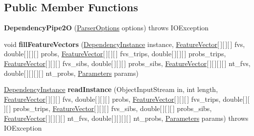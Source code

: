 \subsection*{Public Member Functions}
\begin{DoxyCompactItemize}
\item 
\hypertarget{classmstparser_1_1DependencyPipe2O_a552af844f0b5a779dae5b9fd55521396}{
{\bfseries DependencyPipe2O} (\hyperlink{classmstparser_1_1ParserOptions}{ParserOptions} options)  throws IOException }
\label{classmstparser_1_1DependencyPipe2O_a552af844f0b5a779dae5b9fd55521396}

\item 
\hypertarget{classmstparser_1_1DependencyPipe2O_a8c6d0b632717356802aa04e0ea8f2e9c}{
void {\bfseries fillFeatureVectors} (\hyperlink{classmstparser_1_1DependencyInstance}{DependencyInstance} instance, \hyperlink{classmstparser_1_1FeatureVector}{FeatureVector}\mbox{[}$\,$\mbox{]}\mbox{[}$\,$\mbox{]}\mbox{[}$\,$\mbox{]} fvs, double\mbox{[}$\,$\mbox{]}\mbox{[}$\,$\mbox{]}\mbox{[}$\,$\mbox{]} probs, \hyperlink{classmstparser_1_1FeatureVector}{FeatureVector}\mbox{[}$\,$\mbox{]}\mbox{[}$\,$\mbox{]}\mbox{[}$\,$\mbox{]} fvs\_\-trips, double\mbox{[}$\,$\mbox{]}\mbox{[}$\,$\mbox{]}\mbox{[}$\,$\mbox{]} probs\_\-trips, \hyperlink{classmstparser_1_1FeatureVector}{FeatureVector}\mbox{[}$\,$\mbox{]}\mbox{[}$\,$\mbox{]}\mbox{[}$\,$\mbox{]} fvs\_\-sibs, double\mbox{[}$\,$\mbox{]}\mbox{[}$\,$\mbox{]}\mbox{[}$\,$\mbox{]} probs\_\-sibs, \hyperlink{classmstparser_1_1FeatureVector}{FeatureVector}\mbox{[}$\,$\mbox{]}\mbox{[}$\,$\mbox{]}\mbox{[}$\,$\mbox{]}\mbox{[}$\,$\mbox{]} nt\_\-fvs, double\mbox{[}$\,$\mbox{]}\mbox{[}$\,$\mbox{]}\mbox{[}$\,$\mbox{]}\mbox{[}$\,$\mbox{]} nt\_\-probs, \hyperlink{classmstparser_1_1Parameters}{Parameters} params)}
\label{classmstparser_1_1DependencyPipe2O_a8c6d0b632717356802aa04e0ea8f2e9c}

\item 
\hypertarget{classmstparser_1_1DependencyPipe2O_acf28a11a4f3342130b68b75cf6198f6c}{
\hyperlink{classmstparser_1_1DependencyInstance}{DependencyInstance} {\bfseries readInstance} (ObjectInputStream in, int length, \hyperlink{classmstparser_1_1FeatureVector}{FeatureVector}\mbox{[}$\,$\mbox{]}\mbox{[}$\,$\mbox{]}\mbox{[}$\,$\mbox{]} fvs, double\mbox{[}$\,$\mbox{]}\mbox{[}$\,$\mbox{]}\mbox{[}$\,$\mbox{]} probs, \hyperlink{classmstparser_1_1FeatureVector}{FeatureVector}\mbox{[}$\,$\mbox{]}\mbox{[}$\,$\mbox{]}\mbox{[}$\,$\mbox{]} fvs\_\-trips, double\mbox{[}$\,$\mbox{]}\mbox{[}$\,$\mbox{]}\mbox{[}$\,$\mbox{]} probs\_\-trips, \hyperlink{classmstparser_1_1FeatureVector}{FeatureVector}\mbox{[}$\,$\mbox{]}\mbox{[}$\,$\mbox{]}\mbox{[}$\,$\mbox{]} fvs\_\-sibs, double\mbox{[}$\,$\mbox{]}\mbox{[}$\,$\mbox{]}\mbox{[}$\,$\mbox{]} probs\_\-sibs, \hyperlink{classmstparser_1_1FeatureVector}{FeatureVector}\mbox{[}$\,$\mbox{]}\mbox{[}$\,$\mbox{]}\mbox{[}$\,$\mbox{]}\mbox{[}$\,$\mbox{]} nt\_\-fvs, double\mbox{[}$\,$\mbox{]}\mbox{[}$\,$\mbox{]}\mbox{[}$\,$\mbox{]}\mbox{[}$\,$\mbox{]} nt\_\-probs, \hyperlink{classmstparser_1_1Parameters}{Parameters} params)  throws IOException }
\label{classmstparser_1_1DependencyPipe2O_acf28a11a4f3342130b68b75cf6198f6c}

\end{DoxyCompactItemize}
